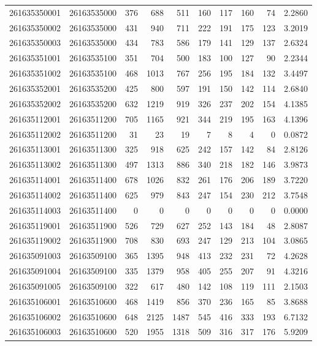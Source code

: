 \documentclass[
  11pt,
]{article}
\begin{document}
\begin{longtable}[t]{llrrrrrrrr}
261635350001 & 26163535000 & 376 & 688 & 511 & 160 & 117 & 160 & 74 & 2.2860\\
261635350002 & 26163535000 & 431 & 940 & 711 & 222 & 191 & 175 & 123 & 3.2019\\
261635350003 & 26163535000 & 434 & 783 & 586 & 179 & 141 & 129 & 137 & 2.6324\\
261635351001 & 26163535100 & 351 & 704 & 500 & 183 & 100 & 127 & 90 & 2.2344\\
261635351002 & 26163535100 & 468 & 1013 & 767 & 256 & 195 & 184 & 132 & 3.4497\\
261635352001 & 26163535200 & 425 & 800 & 597 & 191 & 150 & 142 & 114 & 2.6840\\
261635352002 & 26163535200 & 632 & 1219 & 919 & 326 & 237 & 202 & 154 & 4.1385\\
261635112001 & 26163511200 & 705 & 1165 & 921 & 344 & 219 & 195 & 163 & 4.1396\\
261635112002 & 26163511200 & 31 & 23 & 19 & 7 & 8 & 4 & 0 & 0.0872\\
261635113001 & 26163511300 & 325 & 918 & 625 & 242 & 157 & 142 & 84 & 2.8126\\
261635113002 & 26163511300 & 497 & 1313 & 886 & 340 & 218 & 182 & 146 & 3.9873\\
261635114001 & 26163511400 & 678 & 1026 & 832 & 261 & 176 & 206 & 189 & 3.7220\\
261635114002 & 26163511400 & 625 & 979 & 843 & 247 & 154 & 230 & 212 & 3.7548\\
261635114003 & 26163511400 & 0 & 0 & 0 & 0 & 0 & 0 & 0 & 0.0000\\
261635119001 & 26163511900 & 526 & 729 & 627 & 252 & 143 & 184 & 48 & 2.8087\\
261635119002 & 26163511900 & 708 & 830 & 693 & 247 & 129 & 213 & 104 & 3.0865\\
261635091003 & 26163509100 & 365 & 1395 & 948 & 413 & 232 & 231 & 72 & 4.2628\\
261635091004 & 26163509100 & 335 & 1379 & 958 & 405 & 255 & 207 & 91 & 4.3216\\
261635091005 & 26163509100 & 322 & 617 & 480 & 142 & 108 & 119 & 111 & 2.1503\\
261635106001 & 26163510600 & 468 & 1419 & 856 & 370 & 236 & 165 & 85 & 3.8688\\
261635106002 & 26163510600 & 648 & 2125 & 1487 & 545 & 416 & 333 & 193 & 6.7132\\
261635106003 & 26163510600 & 520 & 1955 & 1318 & 509 & 316 & 317 & 176 & 5.9209\\

\end{longtable}
\end{document}
